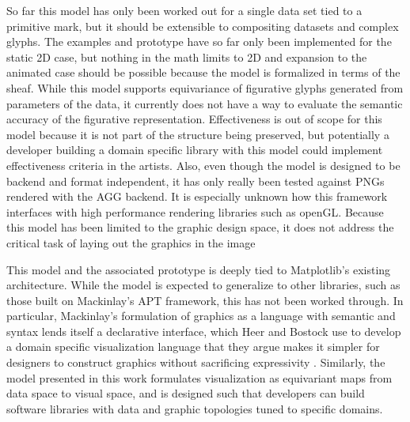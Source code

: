 \documentclass[../main.tex]{subfiles}
\begin{document}
So far this model has only been worked out for a single data set tied to a primitive mark, but it should be extensible to compositing datasets and complex glyphs. The examples and prototype have so far only been implemented for the static 2D case, but nothing in the math limits to 2D and expansion to the animated case should be possible because the model is formalized in terms of the sheaf. While this model supports equivariance of figurative glyphs generated from parameters of the data\cite{beckfeathers2014,byrneFigurativeFramesCritical2017}, it currently does not have a way to evaluate the semantic accuracy of the figurative representation. Effectiveness is out of scope for this model because it is not part of the structure being preserved, but potentially a developer building a domain specific library with this model could implement effectiveness criteria in the artists. Also, even though the model is designed to be backend and format independent, it has only really been tested against PNGs rendered with the AGG backend. It is especially unknown how this framework interfaces with high performance rendering libraries such as openGL\cite{CarsonOpenGL1997}.  Because this model has been limited to the graphic design space, it does not address the critical task of laying out the graphics in the image

This model and the associated prototype is deeply tied to Matplotlib's existing architecture. While the model is expected to generalize to other libraries, such as those built on Mackinlay's APT framework, this has not been worked through. In particular, Mackinlay's formulation of graphics as a language with semantic and syntax lends itself a declarative interface\cite{loudenProgrammingLanguagesPrinciples2010}, which Heer and Bostock use to develop a domain specific visualization language that they argue makes it simpler for designers to construct graphics without sacrificing expressivity \cite{heerDeclarative2010}. Similarly, the model presented in this work formulates visualization as equivariant maps from data space to visual space, and is designed such that developers can build software libraries with data and graphic topologies tuned to specific domains. 
\end{document}
